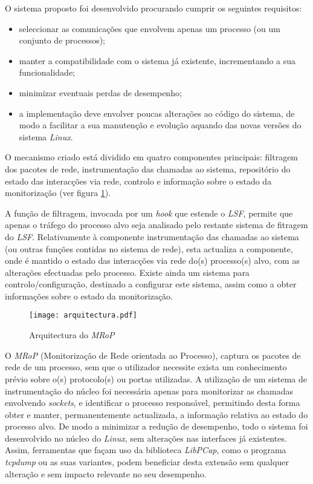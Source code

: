 O sistema proposto foi desenvolvido procurando cumprir os seguintes requisitos:
\begin{itemize}
\item seleccionar as comunicações que envolvem apenas um processo (ou um conjunto de processos);
\item manter a compatibilidade com o sistema já existente, incrementando a sua funcionalidade;
\item minimizar eventuais perdas de desempenho;
\item a implementação deve envolver poucas alterações ao código do sistema, de modo a facilitar a sua manutenção e evolução aquando das novas versões do sistema \textit{Linux}.
\end{itemize}

O mecanismo criado está dividido em quatro componentes principais: filtragem dos pacotes de rede, instrumentação das chamadas ao sistema, repositório do estado das interacções via rede, controlo e informação sobre o estado da monitorização (ver figura \ref{fig:arquitectura}).

A função de filtragem, invocada por um \textit{hook} que estende o \textit{LSF}, permite que apenas o tráfego do processo alvo seja analisado pelo restante sistema de fitragem do \textit{LSF}.
Relativamente à componente instrumentação das chamadas ao sistema (ou outras funções contidas no sistema de rede), esta actualiza a componente, onde é mantido o estado das interacções via rede do(s) processo(s) alvo, com as alterações efectuadas pelo processo.
Existe ainda um sistema para controlo/configuração, destinado a configurar este sistema, assim como a obter informações sobre o estado da monitorização.

\begin{figure}[htbp]
\begin{center}
\texttt{[image: arquitectura.pdf]} 
\caption{Arquitectura do \textit{MRoP}}
\label{fig:arquitectura}
\end{center}
\end{figure}

O \textit{MRoP} (Monitorização de Rede orientada ao Processo), captura os pacotes de rede de um processo, sem que o utilizador necessite exista um conhecimento prévio sobre o(s) protocolo(s) ou portas utilizadas.
A utilização de um sistema de instrumentação do núcleo foi necessária apenas para monitorizar as chamadas envolvendo \textit{sockets}, e identificar o processo responsável, permitindo desta forma obter e manter, permanentemente actualizada, a informação relativa ao estado do processo alvo.
De modo a minimizar a redução de desempenho, todo o sistema foi desenvolvido no núcleo do \textit{Linux}, sem alterações nas interfaces já existentes.
Assim, ferramentas que façam uso da biblioteca \textit{LibPCap}, como o programa \textit{tcpdump} ou as suas variantes, podem beneficiar desta extensão sem qualquer alteração e sem impacto relevante no seu desempenho.


